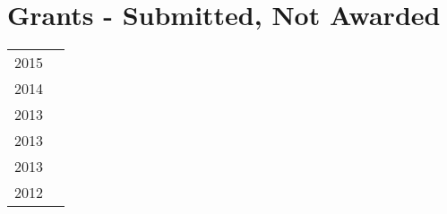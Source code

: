 \section*{Grants - Submitted, Not Awarded}
\begin{tabular}{L!{\VRule}R}
2015&\\
2014&\\
2013&\\
2013&\\
2013&\\
2012&\\
\end{tabular}